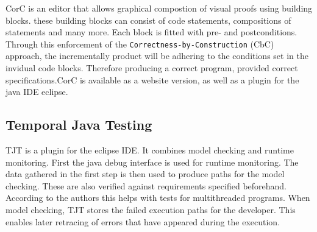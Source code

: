 CorC is an editor that allows graphical compostion of visual proofs using building blocks. these building blocks can consist of code statements, compositions of statements and many more. Each block is fitted with pre- and postconditions. 
Through this enforcement of the \verb|Correctness-by-Construction| (CbC) approach, the incrementally product will be adhering to the conditions set in the invidual code blocks.
Therefore producing a correct program, provided correct specifications.CorC is available as a website version, as well as a plugin for the java IDE eclipse. 

\subsection[TJT]{Temporal Java Testing\citep{ADALID201461}}
TJT is a plugin for the eclipse IDE. It combines model checking and runtime monitoring. First the java debug interface is used for runtime monitoring. The data gathered in the first step is then used to produce paths for the model checking. These are also verified against requirements specified beforehand. According to the authors this helps with tests for multithreaded programs. When model checking, TJT stores the failed execution paths for the developer. This enables later retracing of errors that have appeared during the execution. 


